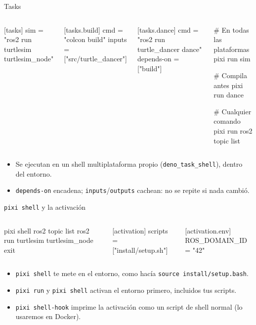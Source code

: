 \documentclass[aspectratio=169]{beamer}
\begin{document}
\begin{frame}[fragile]{Tasks}
\begin{columns}[T]
[tasks]
sim = "ros2 run turtlesim turtlesim_node"

[tasks.build]
cmd = "colcon build"
inputs = ["src/turtle_dancer"]

[tasks.dance]
cmd = "ros2 run turtle_dancer dance"
depends-on = ["build"]
\begin{terminal}
# En todas las plataformas
pixi run sim

# Compila antes
pixi run dance

# Cualquier comando
pixi run ros2 topic list
\end{terminal}
\end{columns}
\vfill
\begin{itemize}
    \item Se ejecutan en un shell multiplataforma propio (\texttt{deno\_task\_shell}), dentro del entorno.
    \item \lstinline|depends-on| encadena; \lstinline|inputs|/\lstinline|outputs| cachean: no se repite si nada cambió.
\end{itemize}
\end{frame}

\begin{frame}[fragile]{\texttt{pixi shell} y la activación}
\begin{columns}[T]
\begin{terminal}
pixi shell
ros2 topic list
ros2 run turtlesim turtlesim_node
exit
\end{terminal}
[activation]
scripts = ["install/setup.sh"]

[activation.env]
ROS_DOMAIN_ID = "42"
\end{columns}
\vfill
\begin{itemize}
    \item \lstinline|pixi shell| te mete en el entorno, como hacía \lstinline|source install/setup.bash|.
    \item \lstinline|pixi run| y \lstinline|pixi shell| activan el entorno primero, incluidos tus scripts.
    \item \lstinline|pixi shell-hook| imprime la activación como un script de shell normal (lo usaremos en Docker).
\end{itemize}
\end{frame}
\end{document}
